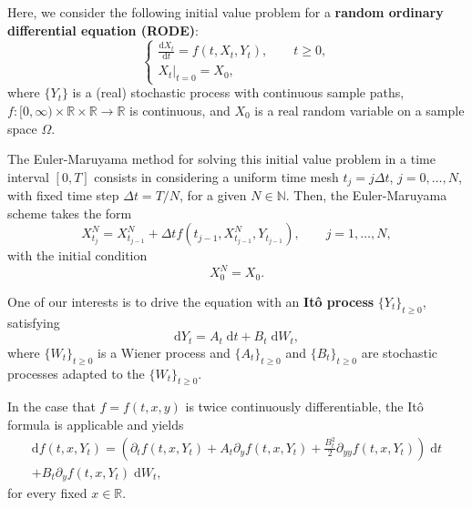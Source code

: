 \documentclass[reqno,12pt]{amsart}
\theoremstyle{plain}%
\theoremstyle{definition}
\begin{document}
Here, we consider the following initial value problem for a \textbf{random ordinary differential equation (RODE)}:
\begin{equation}
  \label{rodeeq}
  \begin{cases}
    \displaystyle \frac{\mathrm{d}X_t}{\mathrm{d} t} = f(t, X_t, Y_t), \qquad t \geq 0, \\
    \left. X_t \right|_{t = 0} = X_0,
  \end{cases}
\end{equation}
where $\{Y_t\}$ is a (real) stochastic process with continuous sample paths, $f:[0, \infty) \times \mathbb{R} \times\mathbb{R} \rightarrow \mathbb{R}$ is continuous, and $X_0$ is a real random variable on a sample space $\Omega$.

The Euler-Maruyama method for solving this initial value problem in a time interval $[0, T]$ consists in considering a uniform time mesh $t_j = j\Delta t$, $j = 0, \ldots, N$, with fixed time step $\Delta t = T/N$, for a given $N\in \mathbb{N}$. Then, the Euler-Maruyama scheme takes the form
\begin{equation}
  \label{emscheme}
  X_{t_j}^N = X_{t_{j-1}}^N + \Delta t f(t_{j-1}, X_{t_{j-1}}^N, Y_{t_{j-1}}), \qquad j = 1, \ldots, N,
\end{equation}
with the initial condition
\begin{equation}
  \label{iccondition}
  X_0^N = X_0.
\end{equation}

One of our interests is to drive the equation with an \textbf{It\^o process} $\{Y_t\}_{t\geq 0}$, satisfying
\begin{equation}
  \label{itoprocess}
  \mathrm{d}Y_t = A_t \;\mathrm{d}t + B_t \;\mathrm{d}W_t,
\end{equation}
where $\{W_t\}_{t\geq 0}$ is a Wiener process and $\{A_t\}_{t \geq 0}$ and $\{B_t\}_{t \geq 0}$ are stochastic processes adapted to the $\{W_t\}_{t\geq 0}$.

In the case that $f=f(t, x, y)$ is twice continuously differentiable, the It\^o formula is applicable and yields
\begin{multline}
  \label{itoformula}
  \mathrm{d}f(t, x, Y_t) = \left(\partial_t f(t, x, Y_t) + A_t \partial_y f(t, x, Y_t)  + \frac{B_t^2}{2}\partial_{yy}f(t, x, Y_t) \right) \;\mathrm{d}t \\ + B_t \partial_y f(t, x, Y_t)\;\mathrm{d}W_t,
\end{multline}
for every fixed $x\in \mathbb{R}$.
\end{document}
